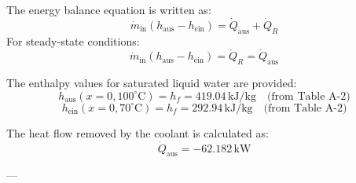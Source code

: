 The energy balance equation is written as:  
\[
\dot{m}_{\text{in}} (h_{\text{aus}} - h_{\text{ein}}) = \dot{Q}_{\text{aus}} + \dot{Q}_R
\]  
For steady-state conditions:  
\[
\dot{m}_{\text{in}} (h_{\text{aus}} - h_{\text{ein}}) = \dot{Q}_R = \dot{Q}_{\text{aus}}
\]  

The enthalpy values for saturated liquid water are provided:  
\[
h_{\text{aus}} (x = 0, 100^\circ\text{C}) = h_f = 419.04 \, \text{kJ/kg} \quad \text{(from Table A-2)}
\]  
\[
h_{\text{ein}} (x = 0, 70^\circ\text{C}) = h_f = 292.94 \, \text{kJ/kg} \quad \text{(from Table A-2)}
\]  

The heat flow removed by the coolant is calculated as:  
\[
\dot{Q}_{\text{aus}} = -62.182 \, \text{kW}
\]  

---